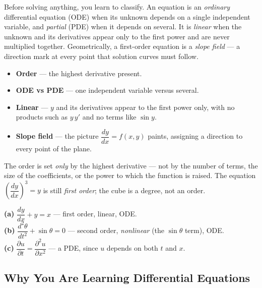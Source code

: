 Before solving anything, you learn to classify. An equation is an \emph{ordinary}
differential equation (ODE) when its unknown depends on a single independent
variable, and \emph{partial} (PDE) when it depends on several. It is
\emph{linear} when the unknown and its derivatives appear only to the first
power and are never multiplied together. Geometrically, a first-order equation
is a \emph{slope field} --- a direction mark at every point that solution curves
must follow.

\begin{formulabox}
\begin{itemize}[leftmargin=1.4em, itemsep=2pt]
    \item \textbf{Order} --- the highest derivative present.
    \item \textbf{ODE vs PDE} --- one independent variable versus several.
    \item \textbf{Linear} --- $y$ and its derivatives appear to the first power
          only, with no products such as $y\,y'$ and no terms like $\sin y$.
    \item \textbf{Slope field} --- the picture $\dfrac{dy}{dx} = f(x,y)$ paints,
          assigning a direction to every point of the plane.
\end{itemize}
\end{formulabox}

\begin{warningbox}
The order is set \emph{only} by the highest derivative --- not by the number of
terms, the size of the coefficients, or the power to which the function is
raised. The equation $\left(\dfrac{dy}{dx}\right)^{3} = y$ is still
\emph{first order}; the cube is a degree, not an order.
\end{warningbox}

\begin{examplebox}
\textbf{(a)} $\dfrac{dy}{dx} + y = x$ --- first order, linear, ODE.\\
\textbf{(b)} $\dfrac{d^{2}\theta}{dt^{2}} + \sin\theta = 0$ --- second order,
\emph{nonlinear} (the $\sin\theta$ term), ODE.\\
\textbf{(c)} $\dfrac{\partial u}{\partial t} = \dfrac{\partial^{2} u}{\partial x^{2}}$
--- a PDE, since $u$ depends on both $t$ and $x$.
\end{examplebox}

\subsection{Why You Are Learning Differential Equations}

